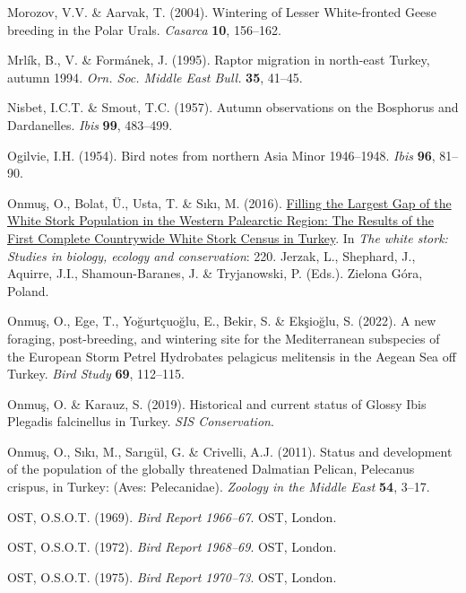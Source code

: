 \documentclass[
  a4paper,
  DIV=11,
  numbers=noendperiod]{scrreprt}
\newlength{\cslhangindent}
\newenvironment{CSLReferences}[2] %
 {\begin{list}{}{%
  \setlength{\itemindent}{0pt}
  \setlength{\leftmargin}{0pt}
  \setlength{\parsep}{0pt}
  \ifodd #1
   \setlength{\leftmargin}{\cslhangindent}
   \setlength{\itemindent}{-1\cslhangindent}
  \fi
  \setlength{\itemsep}{#2\baselineskip}}}
 {\end{list}}
\begin{document}
\begin{CSLReferences}{1}{1}
Morozov, V.V. \& Aarvak, T. (2004). {Wintering of Lesser White-fronted
Geese breeding in the Polar Urals}. \emph{Casarca} \textbf{10},
156--162.

Mrlík, B., V. \& Formánek, J. (1995). {Raptor migration in north-east
Turkey, autumn 1994}. \emph{Orn. Soc. Middle East Bull.} \textbf{35},
41--45.

Nisbet, I.C.T. \& Smout, T.C. (1957). {Autumn observations on the
Bosphorus and Dardanelles}. \emph{Ibis} \textbf{99}, 483--499.

Ogilvie, I.H. (1954). {Bird notes from northern Asia Minor 1946--1948}.
\emph{Ibis} \textbf{96}, 81--90.

Onmuş, O., Bolat, Ü., Usta, T. \& Sıkı, M. (2016).
\href{https://doi.org/10.13140/2.1.3377.6001}{{Filling the Largest Gap
of the White Stork Population in the Western Palearctic Region: The
Results of the First Complete Countrywide White Stork Census in
Turkey}}. In \emph{The white stork: Studies in biology, ecology and
conservation}: 220. Jerzak, L., Shephard, J., Aquirre, J.I.,
Shamoun-Baranes, J. \& Tryjanowski, P. (Eds.). Zielona Góra, Poland.

Onmuş, O., Ege, T., Yoğurtçuoğlu, E., Bekir, S. \& Ekşioğlu, S. (2022).
{A new foraging, post-breeding, and wintering site for the Mediterranean
subspecies of the European Storm Petrel Hydrobates pelagicus melitensis
in the Aegean Sea off Turkey}. \emph{Bird Study} \textbf{69}, 112--115.

Onmuş, O. \& Karauz, S. (2019). {Historical and current status of Glossy
Ibis Plegadis falcinellus in Turkey}. \emph{SIS Conservation}.

Onmuş, O., Sıkı, M., Sarıgül, G. \& Crivelli, A.J. (2011). {Status and
development of the population of the globally threatened Dalmatian
Pelican, Pelecanus crispus, in Turkey: (Aves: Pelecanidae)}.
\emph{Zoology in the Middle East} \textbf{54}, 3--17.

OST, O.S.O.T. (1969). \emph{{Bird Report 1966--67}}. OST, London.

OST, O.S.O.T. (1972). \emph{{Bird Report 1968--69}}. OST, London.

OST, O.S.O.T. (1975). \emph{{Bird Report 1970--73}}. OST, London.


\end{CSLReferences}
\end{document}
